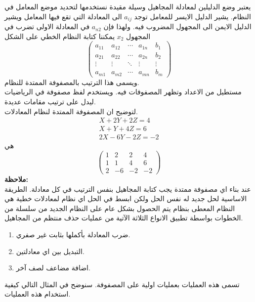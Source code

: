 \noindent
يعتبر وضع الدليلين لمعادلة المجاهيل وسيلة مقيدة نستخدمها لتحديد موضع المعامل في النظام. يشير الدليل الايسر للمعامل توجد $a_{ij}$ الى المعادلة التي تقع فيها المعامل ويشير الدليل الايمن الى المجهول المضروب فيه. ولهذا فإن $a_{n2}$ في المعادلة الاولى تضرب في المجهول $x_2$ يمكننا كتابة النظام الخطي على الشكل
\[
\left(
\begin{array}{cccc|c}
	a_{11} & a_{12} & \cdots & a_{1n} & b_1\\
	a_{21} & a_{22} & \cdots & a_{2n} & b_2\\
	\vdots&\vdots&\ddots&\vdots &\vdots\\
	a_{m1} & a_{m2} & \cdots& a_{mn} & b_m
\end{array}
\right)
\]
ويسمى هذا الترتيب بالمصفوفة الممتدة للنظام.\\
مستطيل من الاعداد وتظهر المصفوفات فيه. ويستخدم لفظ مصفوفة في الرياضيات ليدل على ترتيب مقامات عديدة.\\
\noindent
 لتوضيح ان المصفوفة الممتدة لنظام المعادلات.
 \begin{gather*}
 	X + 2Y + 2Z = 4\\
 	X+Y +4Z = 6\\
 	2X - 6Y - 2Z =-2
 \end{gather*}
 هي
 \[
 \left(
 \begin{array}{ccc|c}
 	1&2&2&4\\
 	1&1&4&6\\
 	2 &-6& -2& -2
 \end{array}
 \right)
 \]
 \noindent
\textbf{ملاحظة:}\\ \noindent
 	عند بناء اي مصفوفة ممتدة يجب كتابة المجاهيل بنفس الترتيب في كل معادلة.
 	الطريقة الاساسية لحل جديد له نفس الحل ولكن ابسط في الحل اي نظام لمعادلات خطية هي النظام المعطى بنظام يتم الحصول بشكل عام على النظام الجديد من سلسلة من الخطوات بواسطة تطبيق الانواع الثلاثة الآتية من عمليات حذف منتظم من المجاهيل.
 \begin{enumerate}
 	\item ضرب المعادلة بأكملها بثابت غير صفري.
 	\item التبديل بين  اي معادلتين.
 	\item اضافة مضاعف لصف آخر.
 \end{enumerate}  
  تسمى هذه العمليات بعمليات اولية على المصفوفة. سنوضح في المثال التالي كيفية استخدام هذه العمليات.

